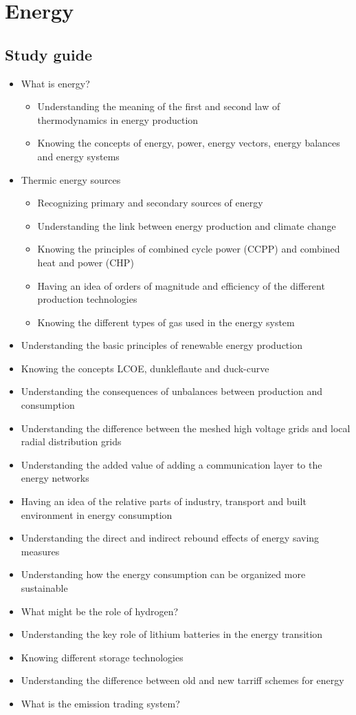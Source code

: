 \documentclass[../summary.tex]{subfiles}
\begin{document}
	
	\section{Energy}
	
	\subsection{Study guide}
	\begin{itemize} 
		\setlength{\itemsep}{0pt}
		\item What is energy?
		\begin{itemize}
			\item Understanding the meaning of the first and second law of thermodynamics in energy production
			\item Knowing the concepts of energy, power, energy vectors, energy balances and energy systems
		\end{itemize}
		\item Thermic energy sources
		\begin{itemize}
			\item Recognizing primary and secondary sources of energy
			\item Understanding the link between energy production and climate change
			\item Knowing the principles of combined cycle power (CCPP) and combined heat and power (CHP)
			\item Having an idea of orders of magnitude and efficiency of the different production technologies
			\item Knowing the different types of gas used in the energy system
		\end{itemize}
		\item Understanding the basic principles of renewable energy production
		\item Knowing the concepts LCOE, dunkleflaute and duck-curve
		\item Understanding the consequences of unbalances between production and consumption
		\item Understanding the difference between the meshed high voltage grids and local radial distribution grids
		\item Understanding the added value of adding a communication layer to the energy networks
		\item Having an idea of the relative parts of industry, transport and built environment in energy consumption
		\item Understanding the direct and indirect rebound effects of energy saving measures
		\item Understanding how the energy consumption can be organized more sustainable
		\item What might be the role of hydrogen?
		\item Understanding the key role of lithium batteries in the energy transition
		\item Knowing different storage technologies
		\item Understanding the difference between old and new tarriff schemes for energy
		\item What is the emission trading system?
	\end{itemize}
	\newpage
\end{document}
